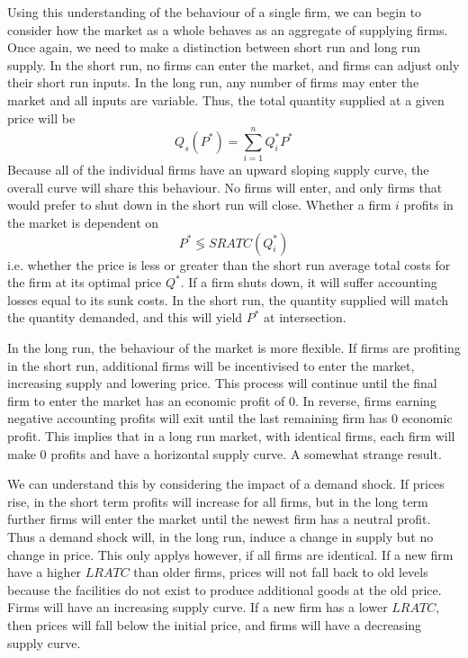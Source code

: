 \documentclass[12pt]{report}
\begin{document}
\begin{flushleft}
\bigskip
Using this understanding of the behaviour of a single firm, we can begin to
consider how the market as a whole behaves as an aggregate of supplying firms.
Once again, we need to make a distinction between short run and long run 
supply. In the short run, no firms can enter the market, and firms can adjust 
only their short run inputs. In the long run, any number of firms may enter the
market and all inputs are variable. Thus, the total quantity supplied at a 
given price will be
\[Q_s(P^*) = \sum^n_{i = 1}Q^*_iP^*\]
Because all of the individual firms have an upward sloping supply curve, the 
overall curve will share this behaviour. No firms will enter, and only firms
that would prefer to shut down in the short run will close. Whether a firm 
\(i\) profits in the market is dependent on
\[P^* \lessgtr SRATC(Q^*_i)\]
i.e. whether the price is less or greater than the short run average total 
costs for the firm at its optimal price \(Q^*\). If a firm shuts down, it will
suffer accounting losses equal to its sunk costs. In the short run, the 
quantity supplied will match the quantity demanded, and this will yield 
\(P^*\) at intersection.

\bigskip
In the long run, the behaviour of the market is more flexible. If firms are
profiting in the short run, additional firms will be incentivised to enter the
market, increasing supply and lowering price. This process will continue until
the final firm to enter the market has an economic profit of \(0\). In reverse,
firms earning negative accounting profits will exit until the last remaining
firm has \(0\) economic profit. This implies that in a long run market, with
identical firms, each firm will make \(0\) profits and have a horizontal supply
curve. A somewhat strange result.

\bigskip
We can understand this by considering the impact of a demand shock. If prices
rise, in the short term profits will increase for all firms, but in the long
term further firms will enter the market until the newest firm has a neutral
profit. Thus a demand shock will, in the long run, induce a change in supply 
but no change in price. This only applys however, if all firms are identical.
If a new firm have a higher \(LRATC\) than older firms, prices will not fall
back to old levels because the facilities do not exist to produce additional
goods at the old price. Firms will have an increasing supply curve. If a new
firm has a lower \(LRATC\), then prices will fall below the initial price, and
firms will have a decreasing supply curve.


\end{flushleft}
\end{document}
